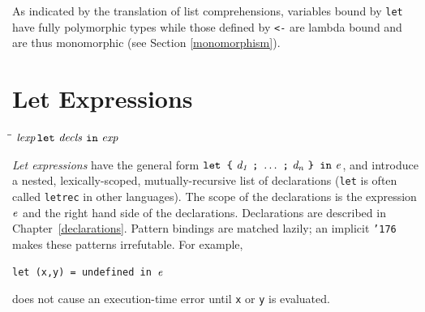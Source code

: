 As indicated by the translation of list comprehensions, variables
bound by \mbox{\tt let} have fully polymorphic types while those defined by
\mbox{\tt <-} are lambda bound and are thus monomorphic (see Section
\ref{monomorphism}).

\section{Let Expressions}
\label{let-expressions}
%
\begin{flushleft}\it\begin{tabbing}
\hspace{0.6in}\=\hspace{3.1in}\=\kill
$\it lexp$\>\makebox[3.5em]{$\rightarrow$}$\it \makebox{\tt let}\ decls\ \makebox{\tt in}\ exp$
\end{tabbing}\end{flushleft}

\noindent
{\em Let expressions} have the general form
\mbox{$\it \makebox{\tt let\ {\char'173}}\ d_1\ \makebox{\tt ;}\ \ldots \ \makebox{\tt ;}\ d_n\ \makebox{\tt {\char'175}\ in}\ e$},
and introduce a
nested, lexically-scoped, 
mutually-recursive list of declarations (\mbox{\tt let} is often called \mbox{\tt letrec} in
other languages).  The scope of the declarations is the expression \mbox{$\it e$}
and the right hand side of the declarations.  Declarations are
described in Chapter~\ref{declarations}.  Pattern bindings are matched
lazily; an implicit \mbox{\tt {\char'176}} makes these patterns
irrefutable.
For example, 

\mbox{\tt let\ (x,y)\ =\ undefined\ in\ }\mbox{$\it e$}
\et

does not cause an execution-time error until \mbox{\tt x} or \mbox{\tt y} is evaluated.

